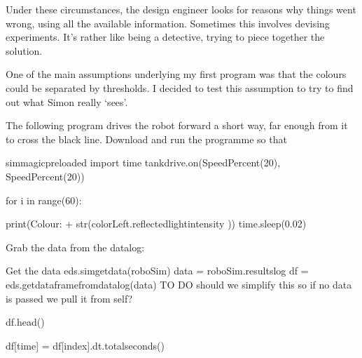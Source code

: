 \documentclass[letterpaper,10pt,english]{sphinxmanual}
\begin{document}
Under these circumstances, the design engineer looks for reasons why things went wrong, using all the available information. Sometimes this involves devising experiments. It’s rather like being a detective, trying to piece together the solution.

One of the main assumptions underlying my first program was that the colours could be separated by thresholds. I decided to test this assumption to try to find out what Simon really ‘sees’.

The following program drives the robot forward a short way, far enough from it to cross the black line. Download and run the programme so that

{
\begin{sphinxVerbatim}[commandchars=\\\{\}]
\llap{\color{nbsphinxin}[ ]:\,\hspace{\fboxrule}\hspace{\fboxsep}}\PYGZpc{}\PYGZpc{}sim\PYGZus{}magic\PYGZus{}preloaded
import time
tank\PYGZus{}drive.on(SpeedPercent(20), SpeedPercent(20))

for i in range(60):

    print(\PYGZsq{}Colour: \PYGZsq{} + str(colorLeft.reflected\PYGZus{}light\PYGZus{}intensity ))
    time.sleep(0.02)
\end{sphinxVerbatim}
}

Grab the data from the datalog:

{
\begin{sphinxVerbatim}[commandchars=\\\{\}]
\llap{\color{nbsphinxin}[ ]:\,\hspace{\fboxrule}\hspace{\fboxsep}}\PYGZsh{} Get the data
\PYGZsh{}eds.sim\PYGZus{}get\PYGZus{}data(roboSim)
data = roboSim.results\PYGZus{}log
df = eds.get\PYGZus{}dataframe\PYGZus{}from\PYGZus{}datalog(data)
\PYGZsh{} TO DO \PYGZhy{} should we simplify this so if no data is passed we pull it from self?

df.head()
\end{sphinxVerbatim}
}

{
\begin{sphinxVerbatim}[commandchars=\\\{\}]
\llap{\color{nbsphinxin}[ ]:\,\hspace{\fboxrule}\hspace{\fboxsep}}df[\PYGZsq{}time\PYGZsq{}] = df[\PYGZsq{}index\PYGZsq{}].dt.total\PYGZus{}seconds()
\end{sphinxVerbatim}
}
\end{document}
